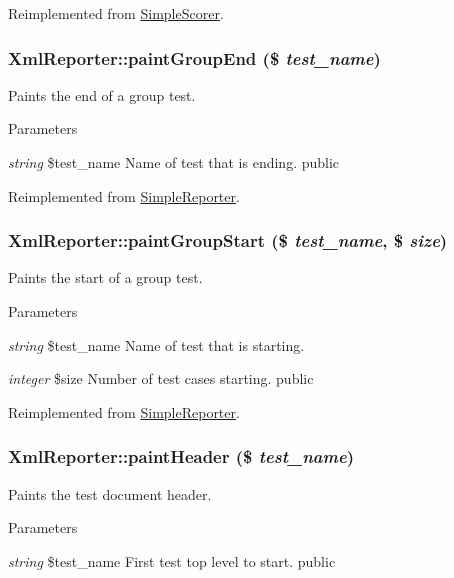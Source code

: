 Reimplemented from \hyperlink{class_simple_scorer_a19d5b72bd448cc22636569e20b64f607}{SimpleScorer}.\hypertarget{class_xml_reporter_a448424e6e8bce6060c6ad6109fcb2300}{
\subsubsection[{paintGroupEnd}]{\setlength{\rightskip}{0pt plus 5cm}XmlReporter::paintGroupEnd (\$ {\em test\_\-name})}}
\label{class_xml_reporter_a448424e6e8bce6060c6ad6109fcb2300}
Paints the end of a group test. 
\begin{DoxyParams}{Parameters}
\item[{\em string}]\$test\_\-name Name of test that is ending.  public \end{DoxyParams}


Reimplemented from \hyperlink{class_simple_reporter_a2b6b699cadeb44f4dc666f3c94ac22be}{SimpleReporter}.\hypertarget{class_xml_reporter_a8260073ecaba7369ae53fde9251d1ef5}{
\subsubsection[{paintGroupStart}]{\setlength{\rightskip}{0pt plus 5cm}XmlReporter::paintGroupStart (\$ {\em test\_\-name}, \/  \$ {\em size})}}
\label{class_xml_reporter_a8260073ecaba7369ae53fde9251d1ef5}
Paints the start of a group test. 
\begin{DoxyParams}{Parameters}
\item[{\em string}]\$test\_\-name Name of test that is starting. \item[{\em integer}]\$size Number of test cases starting.  public \end{DoxyParams}


Reimplemented from \hyperlink{class_simple_reporter_a3e8ad3ae451da1c3ae1e90c5789f7f2b}{SimpleReporter}.\hypertarget{class_xml_reporter_abd986228b92ae1f349b23254ad6a8c01}{
\subsubsection[{paintHeader}]{\setlength{\rightskip}{0pt plus 5cm}XmlReporter::paintHeader (\$ {\em test\_\-name})}}
\label{class_xml_reporter_abd986228b92ae1f349b23254ad6a8c01}
Paints the test document header. 
\begin{DoxyParams}{Parameters}
\item[{\em string}]\$test\_\-name First test top level to start.  public  \end{DoxyParams}


